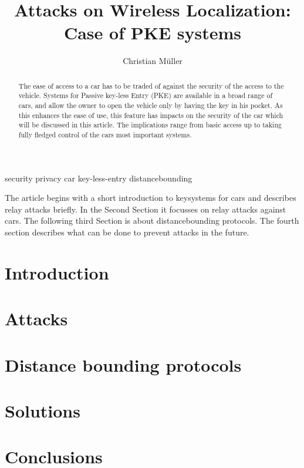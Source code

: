 \documentclass[a4paper]{IEEEtran}
\title{Attacks on Wireless Localization:\\Case of PKE systems}
\author{Christian Müller}
\begin{document}
\maketitle
\begin{IEEEkeywords}
security privacy car key-less-entry distancebounding
\end{IEEEkeywords}


\begin{abstract}
The ease of access to a car has to be traded of against the security of the
access to the vehicle.
Systems for Passive key-less Entry (PKE) are available in a broad range of cars,
and allow the owner to open the vehicle only by having the key in his pocket.
As this enhances the ease of use, this feature has impacts on the security of
the car which will be discussed in this article. The implications range from 
basic access up to taking fully fledged control of the cars most important
systems.
\end{abstract}

The article begins with a short introduction to keysystems for cars and
describes relay attacks briefly.
In the Second Section it focusses on relay attacks against cars.
The following third Section is about distancebounding protocols.
The fourth section describes what can be done to prevent attacks in the future.

\section{Introduction}
	

\section{Attacks}
	

\section{Distance bounding protocols}
	

\section{Solutions}
\label{sec:solutions}
	


\section{Conclusions}
	

\newpage
\nocite{*}


\end{document}
